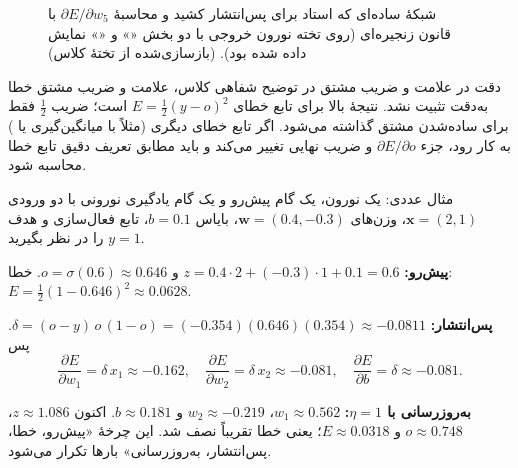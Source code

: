 \begin{figure}[htbp]
\centering
{}

\caption{شبکهٔ ساده‌ای که استاد برای پس‌انتشار کشید و محاسبهٔ $\partial E/\partial w_5$ با قانون زنجیره‌ای (روی تخته نورون خروجی با دو بخش «» و «» نمایش داده شده بود). (بازسازی‌شده از تختهٔ کلاس)}
\end{figure}


\begin{correctionbox}{دقت در علامت و ضریب مشتق}
در توضیح شفاهی کلاس، علامت و ضریب مشتق خطا به‌دقت تثبیت نشد. نتیجهٔ بالا برای تابع خطای $E=\frac12(y-o)^2$ است؛ ضریب $\frac12$ فقط برای ساده‌شدن مشتق گذاشته می‌شود. اگر تابع خطای دیگری (مثلاً  با میانگین‌گیری یا ) به کار رود، جزء $\partial E/\partial o$ و ضریب نهایی تغییر می‌کند و باید مطابق تعریف دقیق تابع خطا محاسبه شود.
\end{correctionbox}

\begin{addedbox}{مثال عددی: یک نورون، یک گام پیش‌رو و یک گام یادگیری}
نورونی با دو ورودی $\mathbf{x}=(2,1)$، وزن‌های $\mathbf{w}=(0.4,-0.3)$، بایاس $b=0.1$، تابع فعال‌سازی  و هدف $y=1$ را در نظر بگیرید.

\textbf{پیش‌رو:} $z=0.4\cdot2+(-0.3)\cdot1+0.1=0.6$ و $o=\sigma(0.6)\approx0.646$. خطا: $E=\frac12(1-0.646)^2\approx0.0628$.

\textbf{پس‌انتشار:} $\delta=(o-y)\,o\,(1-o)=(-0.354)(0.646)(0.354)\approx-0.0811$. پس
\[
\frac{\partial E}{\partial w_1}=\delta\,x_1\approx-0.162,\quad
\frac{\partial E}{\partial w_2}=\delta\,x_2\approx-0.081,\quad
\frac{\partial E}{\partial b}=\delta\approx-0.081 .
\]

\textbf{به‌روزرسانی با $\eta=1$:} $w_1\approx0.562$، $w_2\approx-0.219$ و $b\approx0.181$. اکنون $z\approx1.086$، $o\approx0.748$ و $E\approx0.0318$؛ یعنی خطا تقریباً نصف شد. این چرخهٔ «پیش‌رو، خطا، پس‌انتشار، به‌روزرسانی» بارها تکرار می‌شود.
\end{addedbox}

